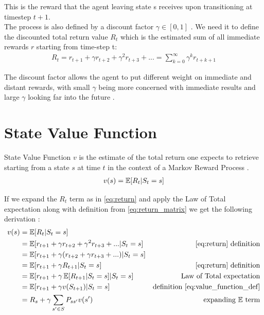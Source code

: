 This is the reward that the agent leaving state s receives upon transitioning at timestep $t+1$.\\

The process is also defined by a discount factor $\gamma \in [0, 1]$ \cite{lecture_lets_go_markov}. We need it to define the discounted total return value $R_t$ which is the estimated sum of all immediate rewards $r$ starting from time-step t:
\begin{align}
    R_t = r_{t+1} + \gamma r_{t+2} + \gamma ^2 r_{t+3} + ... = \sum^{\infty}_{k=0}\gamma^{k}r_{t+k+1} \label{eq:return}
\end{align}

The discount factor allows the agent to put different weight on immediate and distant rewards,
with small $\gamma$ being more concerned with immediate results and large $\gamma$ looking far into the future \cite{lecture_lets_go_markov}. 

\section{State Value Function}
State Value Function $v$ is the estimate of the total return one expects to retrieve starting from a state $s$ at time $t$ in the context 
of a Markov Reward Process \cite{lecture_lets_go_markov}.
\begin{align}
    v(s) = \operatorname{\mathbb{E}}[R_t | S_t = s] \label{eq:value_function_def}
\end{align}

If we expand the $R_t$ term as in \ref{eq:return} and apply the Law of Total expectation along with definition from \ref{eq:return_matrix} we get the following derivation \cite{lecture_lets_go_markov}:
\begin{align*}
    v(s) &= \operatorname{\mathbb{E}}[R_t | S_t = s]\\
         &= \operatorname{\mathbb{E}}[r_{t+1} + \gamma r_{t+2} + \gamma ^2 r_{t+3} + ... | S_t = s] & \text{\ref{eq:return} definition} \\
         &= \operatorname{\mathbb{E}}[r_{t+1} + \gamma (r_{t+2} + \gamma r_{t+3} + ...) | S_t = s]\\
         &= \operatorname{\mathbb{E}}[r_{t+1} + \gamma R_{t+1} | S_t = s] & \text{\ref{eq:return} definition} \\
         &= \operatorname{\mathbb{E}}[r_{t+1} + \gamma \operatorname{\mathbb{E}}[R_{t+1} | S_t = s] | S_t = s] & \text{Law of Total expectation} \\
         &= \operatorname{\mathbb{E}}[r_{t+1} + \gamma v(S_{t+1})| S_t = s] \label{eq:value_function} & \text{definition \ref{eq:value_function_def}} \\
         &= R_s + \gamma \sum_{s' \in S} P_{ss'}v(s') & \text{expanding $\operatorname{\mathbb{E}}$ term}
\end{align*}

